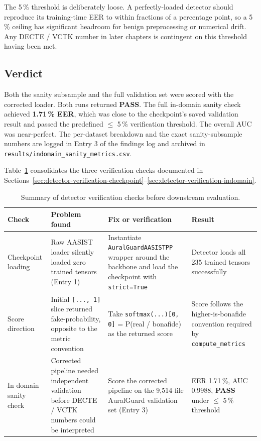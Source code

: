 The 5\,\% threshold is deliberately loose. A perfectly-loaded
detector should reproduce its training-time EER to within
fractions of a percentage point, so a 5\,\% ceiling has significant
headroom for benign preprocessing or numerical drift. Any DECTE /
VCTK number in later chapters is contingent on this threshold
having been met.

\subsection{Verdict}
\label{sec:detector-verification-indomain-verdict}

Both the sanity subsample and the full validation set were
scored with the corrected loader. Both runs returned \textbf{PASS}.
The full in-domain sanity check achieved \textbf{1.71\,\% EER}, which
was close to the checkpoint's saved validation result and passed
the predefined $\leq$ 5\,\% verification threshold. The overall AUC
was near-perfect. The per-dataset breakdown and the exact
sanity-subsample numbers are logged in Entry 3 of the findings log
and archived in \texttt{results/indomain\_sanity\_metrics.csv}.

Table~\ref{tab:detector-verification-summary} consolidates the three
verification checks documented in Sections~\ref{sec:detector-verification-checkpoint}--\ref{sec:detector-verification-indomain}.

\begin{table}[t]
\centering
\caption{Summary of detector verification checks before downstream evaluation.}
\label{tab:detector-verification-summary}
\small
\setlength{\tabcolsep}{4pt}
\begin{tabularx}{\linewidth}{@{}l X X X@{}}
\toprule
\textbf{Check} & \textbf{Problem found} & \textbf{Fix or verification} & \textbf{Result} \\
\midrule
Checkpoint loading & Raw AASIST loader silently loaded zero trained tensors (Entry 1) & Instantiate \texttt{AuralGuardAASISTPP} wrapper around the backbone and load the checkpoint with \texttt{strict=True} & Detector loads all 235 trained tensors successfully \\
Score direction & Initial \texttt{[..., 1]} slice returned fake-probability, opposite to the metric convention & Take \texttt{softmax(...)[0, 0]} = P(real / bonafide) as the returned score & Score follows the higher-is-bonafide convention required by \texttt{compute\_metrics} \\
In-domain sanity check & Corrected pipeline needed independent validation before DECTE / VCTK numbers could be interpreted & Score the corrected pipeline on the 9,514-file AuralGuard validation set (Entry 3) & EER 1.71\,\%, AUC 0.9988, \textbf{PASS} under $\leq$ 5\,\% threshold \\
\bottomrule
\end{tabularx}
\end{table}



